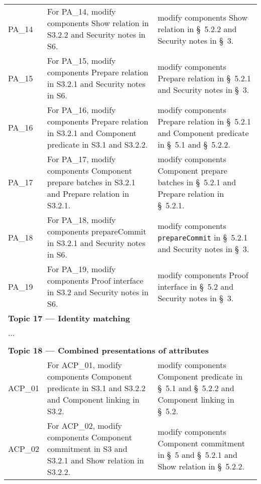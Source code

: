 \begin{landscape}
\begin{longtable}{p{3cm} p{10cm} p{7cm}}
PA\_14 &
For PA\_14, modify components Show relation in S3.2.2 and Security notes in S6. &
modify components Show relation in \S~5.2.2 and Security notes in \S~3. \\

PA\_15 &
For PA\_15, modify components Prepare relation in S3.2.1 and Security notes in S6. &
modify components Prepare relation in \S~5.2.1 and Security notes in \S~3. \\

PA\_16 &
For PA\_16, modify components Prepare relation in S3.2.1 and Component predicate in S3.1 and S3.2.2. &
modify components Prepare relation in \S~5.2.1 and Component predicate in \S~5.1 and \S~5.2.2. \\

PA\_17 &
For PA\_17, modify components Component prepare batches in S3.2.1 and Prepare relation in S3.2.1. &
modify components Component prepare batches in \S~5.2.1 and Prepare relation in \S~5.2.1. \\

PA\_18 &
For PA\_18, modify components prepareCommit in S3.2.1 and Security notes in S6. &
modify components \texttt{prepareCommit} in \S~5.2.1 and Security notes in \S~3. \\

PA\_19 &
For PA\_19, modify components Proof interface in S3.2 and Security notes in S6. &
modify components Proof interface in \S~5.2 and Security notes in \S~3. \\[1em]


\multicolumn{3}{l}{\textbf{Topic 17 — Identity matching}}\\

\multicolumn{3}{l}{...}\\\\[-0.5em]


\multicolumn{3}{l}{\textbf{Topic 18 — Combined presentations of attributes}}\\

ACP\_01 &
For ACP\_01, modify components Component predicate in S3.1 and S3.2.2 and Component linking in S3.2. &
modify components Component predicate in \S~5.1 and \S~5.2.2 and Component linking in \S~5.2. \\

ACP\_02 &
For ACP\_02, modify components Component commitment in S3 and S3.2.1 and Show relation in S3.2.2. &
modify components Component commitment in \S~5 and \S~5.2.1 and Show relation in \S~5.2.2. \\


\end{longtable}
\end{landscape}
